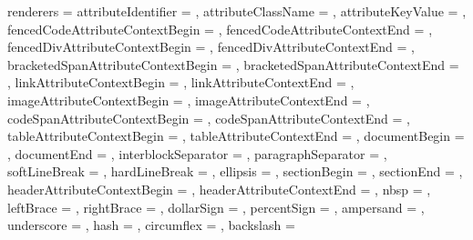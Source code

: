 renderers = {%
  attributeIdentifier = {%
    },
  attributeClassName = {%
    },
  attributeKeyValue = {%
    },
  fencedCodeAttributeContextBegin = {%
    },
  fencedCodeAttributeContextEnd = {%
    },
  fencedDivAttributeContextBegin = {%
    },
  fencedDivAttributeContextEnd = {%
    },
  bracketedSpanAttributeContextBegin = {%
    },
  bracketedSpanAttributeContextEnd = {%
    \GOBBLE},
  linkAttributeContextBegin = {%
    },
  linkAttributeContextEnd = {%
    \GOBBLE},
  imageAttributeContextBegin = {%
    },
  imageAttributeContextEnd = {%
    \GOBBLE},
  codeSpanAttributeContextBegin = {%
    },
  codeSpanAttributeContextEnd = {%
    \GOBBLE},
  tableAttributeContextBegin = {%
    },
  tableAttributeContextEnd = {%
    \GOBBLE},
  documentBegin = {%
    },
  documentEnd = {%
    },
  interblockSeparator = {%
    \GOBBLE},
  paragraphSeparator = {%
    \GOBBLE},
  softLineBreak = {%
    \GOBBLE},
  hardLineBreak = {%
    \GOBBLE},
  ellipsis = {%
    \GOBBLE},
  sectionBegin = {%
    },
  sectionEnd = {%
    },
  headerAttributeContextBegin = {%
    },
  headerAttributeContextEnd = {%
    },
  nbsp = {%
    \GOBBLE},
  leftBrace = {%
    \GOBBLE},
  rightBrace = {%
    \GOBBLE},
  dollarSign = {%
    \GOBBLE},
  percentSign = {%
    \GOBBLE},
  ampersand = {%
    \GOBBLE},
  underscore = {%
    \GOBBLE},
  hash = {%
    \GOBBLE},
  circumflex = {%
    \GOBBLE},
  backslash = {%
}}
